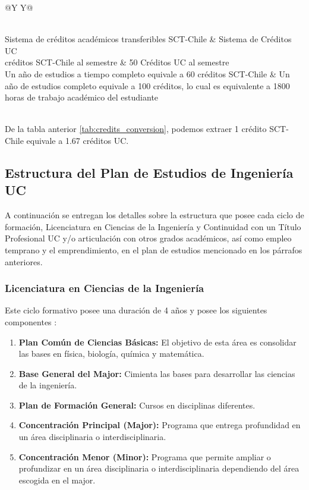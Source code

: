 \begin{tabularx}{\linewidth}{@{}Y Y@{}}
  \caption{Sistema de conversión de Créditos UC y Chileno} \label{tab:credits_conversion}\\
  \toprule
  Sistema de créditos académicos transferibles SCT-Chile	&	Sistema de Créditos UC \\
   créditos SCT-Chile al semestre & 50 Créditos UC al semestre \\
  \midrule
  Un año de estudios a tiempo completo equivale a 60 créditos SCT-Chile & Un año de estudios completo equivale a 100 créditos, lo cual es equivalente a 1800 horas de trabajo académico del estudiante \\
  \bottomrule
   \\
\end{tabularx}

De la tabla anterior \ref{tab:credits_conversion}, podemos extraer 1 crédito SCT-Chile equivale a 1.67 créditos UC.

\subsection{Estructura del Plan de Estudios de Ingeniería UC \label{sec:study_plan_structure}}

A continuación se entregan los detalles sobre la estructura que posee cada ciclo de formación, Licenciatura en Ciencias de la Ingeniería y Continuidad con un Título Profesional UC y/o articulación con otros grados académicos, así como empleo temprano y el emprendimiento, en el plan de estudios mencionado en los párrafos anteriores.

\subsubsection{Licenciatura en Ciencias de la Ingeniería \label{sec:bachelor_structure}}

Este ciclo formativo posee una duración de 4 años y posee los siguientes componentes \cite{student_manual}:

\begin{enumerate}
  \item \textbf{Plan Común de Ciencias Básicas:} El objetivo de esta área es consolidar las bases en física, biología, química y matemática.
  \item \textbf{Base General del Major:} Cimienta las bases para desarrollar las ciencias de la ingeniería.
  \item \textbf{Plan de Formación General:} Cursos en disciplinas diferentes.
  \item \textbf{Concentración Principal (Major):} Programa que entrega profundidad en un área disciplinaria o interdisciplinaria.
  \item \textbf{Concentración Menor (Minor):} Programa que permite ampliar o profundizar en un área disciplinaria o interdisciplinaria dependiendo del área escogida en el major.
\end{enumerate}

